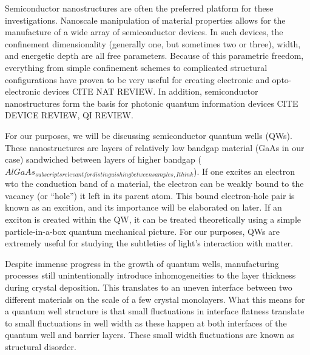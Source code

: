 \indent Semiconductor nanostructures are often the preferred platform for these investigations. Nanoscale manipulation of material properties allows for the manufacture of a wide array of semiconductor devices. In such devices, the confinement dimensionality (generally one, but sometimes two or three), width, and energetic depth are all free parameters. Because of this parametric freedom, everything from simple confinement schemes to complicated structural configurations have proven to be very useful for creating electronic and opto-electronic devices CITE NAT REVIEW. In addition, semiconductor nanostructures form the basis for photonic quantum information devices CITE DEVICE REVIEW, QI REVIEW.

\indent For our purposes, we will be discussing semiconductor quantum wells (QWs). These nanostructures are layers of relatively low bandgap material (GaAs in our case) sandwiched between layers of higher bandgap ($AlGaAs_{subscripts relevant for distinguishing between samples, I think}$). If one excites an electron wto the conduction band of a material, the electron can be weakly bound to the vacancy (or ``hole'') it left in its parent atom. This bound electron-hole pair is known as an excition, and its importance will be elaborated on later. If an exciton is created within the QW, it can be treated theoretically using a simple particle-in-a-box quantum mechanical picture. For our purposes, QWs are extremely useful for studying the subtleties of light's interaction with matter.

\indent Despite immense progress in the growth of quantum wells, manufacturing processes still unintentionally introduce inhomogeneities to the layer thickness during crystal deposition. This translates to an uneven interface between two different materials on the scale of a few crystal monolayers. What this means for a quantum well structure is that small fluctuations in interface flatness translate to small fluctuations in well width as these happen at both interfaces of the quantum well and barrier layers. These small width fluctuations are known as structural disorder.

